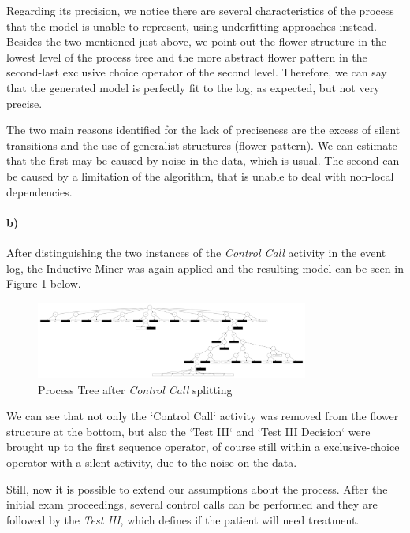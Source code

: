 \documentclass[12pt]{report}
\begin{document}
Regarding its precision, we notice there are several characteristics of the process that the model is unable to represent, using underfitting approaches instead. Besides the two mentioned just above, we point out the flower structure in the lowest level of the process tree and the more abstract flower pattern in the second-last exclusive choice operator of the second level. Therefore, we can say that the generated model is perfectly fit to the log, as expected, but not very precise.

The two main reasons identified for the lack of preciseness are the excess of silent transitions and the use of generalist structures (flower pattern). We can estimate that the first may be caused by noise in the data, which is usual. The second can be caused by a limitation of the algorithm, that is unable to deal with non-local dependencies.

\paragraph{b)} 

After distinguishing the two instances of the \emph{Control Call} activity in the event log, the Inductive Miner was again applied and the resulting model can be seen in Figure \ref{fig:figures-q1_b_tree-pdf} below.

\begin{figure}[h]
    \centering
    \includegraphics[width=0.8\textwidth]{figures/q1_b_tree.pdf}
    \caption{Process Tree after \emph{Control Call} splitting}
    \label{fig:figures-q1_b_tree-pdf}
\end{figure}

We can see that not only the `Control Call` activity was removed from the flower structure at the bottom, but also the `Test III` and `Test III Decision` were brought up to the first sequence operator, of course still within a exclusive-choice operator with a silent activity, due to the noise on the data.

Still, now it is possible to extend our assumptions about the process. After the initial exam proceedings, several control calls can be performed and they are followed by the \emph{Test III}, which defines if the patient will need treatment.
\end{document}
